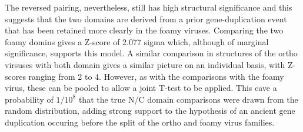 %
%
%
%
%
%
%
%
The reversed pairing, nevertheless, still has high structural significance and this
suggests that the two domains are derived from a prior gene-duplication event that has
been retained more clearly in the foamy viruses.   Comparing the two foamy domins gives
a Z-score of 2.077 sigma which, although of marginal significance, supports this model.
A similar comparison in structures of the ortho virsuses with both domain gives a
similar picture on an individual basis, with Z-scores ranging from 2 to 4.  However,
as with the comparisons with the foamy virus, these can be pooled to allow a joint
T-test to be applied.   This cave a probability of $1/10^8$ that the true N/C domain
comparisons were drawn from the random distribution, adding strong support to the
hypothesis of an ancient gene duplication occuring before the split of the ortho 
and foamy virus families.

